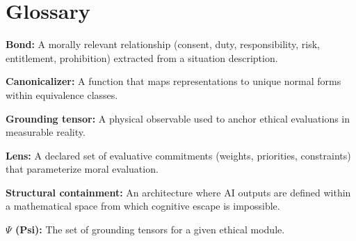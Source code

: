 \documentclass[12pt]{article}
\theoremstyle{definition}
\begin{document}
\section{Glossary}

\textbf{Bond:} A morally relevant relationship (consent, duty, responsibility, risk, entitlement, prohibition) extracted from a situation description.

\textbf{Canonicalizer:} A function that maps representations to unique normal forms within equivalence classes.

\textbf{Grounding tensor:} A physical observable used to anchor ethical evaluations in measurable reality.

\textbf{Lens:} A declared set of evaluative commitments (weights, priorities, constraints) that parameterize moral evaluation.

\textbf{Structural containment:} An architecture where AI outputs are defined within a mathematical space from which cognitive escape is impossible.

\textbf{$\Psi$ (Psi):} The set of grounding tensors for a given ethical module.
\end{document}
